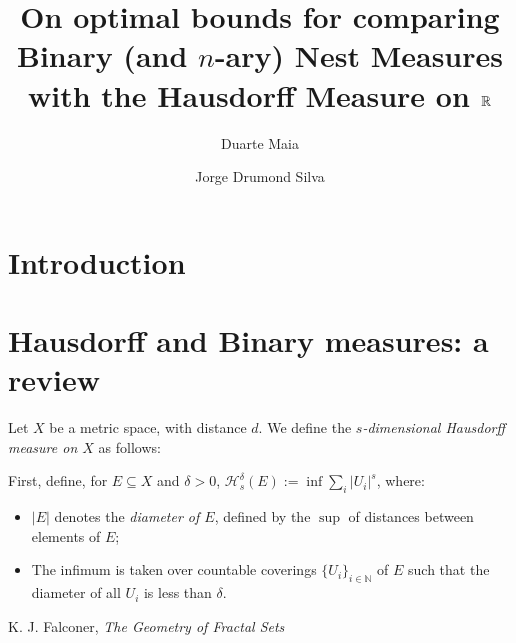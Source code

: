 \documentclass[11pt]{amsart}
\title{\textbf{On optimal bounds for comparing Binary (and $n$-ary) Nest Measures with the Hausdorff Measure on $\mathbb{R}$}}
\author{Duarte Maia}
\author{Jorge Drumond Silva}
\date{}
\newcommand{\N}{\mathbb{N}}
\newcommand{\HH}{\mathcal{H}}
\begin{document}
\maketitle


\begin{abstract}
\lipsum[1]
\end{abstract}


\section{Introduction}

\lipsum[1]

\section{Hausdorff and Binary measures: a review}

Let $X$ be a metric space, with distance $d$. We define the \emph{$s$-dimensional Hausdorff measure on $X$} as follows:

First, define, for $E \subseteq X$ and $\delta > 0$, $\HH_s^\delta(E) := \inf \sum_i \lvert U_i \rvert^s$, where:

\begin{itemize}

\item $\lvert E \rvert$ denotes the \emph{diameter of $E$}, defined by the $\sup$ of distances between elements of $E$;

\item The infimum is taken over countable coverings $\{U_i\}_{i \in \N}$ of $E$ such that the diameter of all $U_i$ is less than $\delta$.

\end{itemize}

\begin{thebibliography}{1}
K. J. Falconer, \textit{The Geometry of Fractal Sets}

\end{thebibliography}
\end{document}
